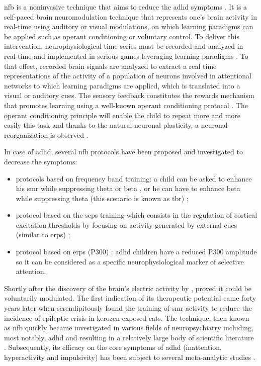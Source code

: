 \gls{nfb} is a noninvasive technique that aims to reduce the \gls{adhd} symptoms \citep{Arns2015, Steffert2010}.
It is a self-paced brain neuromodulation technique that represents one's brain activity in real-time using auditory or 
visual modulations, on which learning paradigms can be applied such as operant conditioning \citep{Reynolds1975} or voluntary control.
To deliver this intervention, neurophysiological time series must be recorded and analyzed in real-time and implemented in serious games 
leveraging learning paradigms \citep{Wang2010}. To that effect, recorded brain signals are analyzed to extract a real time representations of the activity 
of a population of neurons involved in attentional networks to which learning paradigms are applied, which is translated into a visual 
or auditory cues. The sensory feedback constitutes the rewards mechanism that promotes learning using a well-known operant conditioning protocol \citep{Sherlin2011}. 
The operant conditioning principle will enable the child to repeat more and more easily this task and thanks to the natural neuronal plasticity,
a neuronal reorganization is observed \citep{VanDoren2017}. 

In case of \gls{adhd}, several \gls{nfb} protocols have been proposed and investigated to decrease the symptoms: 
\begin{itemize}
	\item protocols based on frequency band training: a child can be asked to enhance his \gls{smr} 
	while suppressing theta or beta \citep{Lubar1976}, or he can have to enhance beta
	while suppressing theta (this scenario is known as \gls{tbr}) \citep{Arns2013};
	\item protocol based on the \glspl{scp} training which consists in the regulation of cortical excitation 
	thresholds by focusing on activity generated by external cues 
	(similar to \glspl{erp}) \citep{Heinrich2004, Banaschewski2007}; 
	\item protocol based on \glspl{erp} (P300) \citep{Fouillen2017}: \gls{adhd} children have a reduced P300 
	amplitude so it can be considered as a specific neurophysiological marker of selective attention. 
\end{itemize} 

Shortly after the discovery of the brain's electric activity by \citet{Berger1929}, \citet{Durup1935} proved it could be voluntarily modulated. 
The first indication of its therapeutic potential came forty years later when \citet{Sterman1974} serendipitously found the training of \gls{smr} 
activity to reduce the incidence of epileptic crisis in kerozen-exposed cats. The technique, then known as \gls{nfb} quickly became investigated in 
various fields of neuropsychiatry including, most notably, \gls{adhd} and resulting in a relatively large body of scientific literature 
\citep{Lubar1976, Rossiter1995, Linden1996, Maurizio2014}. Subsequently, its efficacy on the core symptoms of \gls{adhd} (inattention, hyperactivity 
and impulsivity) has been subject to several meta-analytic studies \citep{Loo2005, Lofthouse2012, Arns2009, Micoulaud2014, Sonuga-Barke2013}. 


